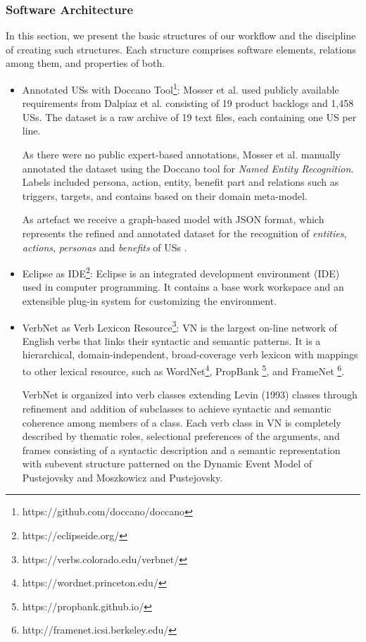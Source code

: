 \subsubsection*{Software Architecture}\label{conflict_architectur}
In this section, we present the basic structures of our workflow and the discipline of creating such structures. Each structure comprises software elements, relations among them, and properties of both.
\begin{itemize}
	\item Annotated USs with Doccano Tool\footnote{https://github.com/doccano/doccano}: Mosser et al. used publicly available requirements from Dalpiaz et al.\cite{Dalpiaz2018} consisting of 19 product backlogs and 1,458 USs. The dataset is a raw archive of 19 text files, each containing one US per line. 
	
	As there were no public expert-based annotations, Mosser et al. manually annotated the dataset using the Doccano tool for \textit{Named Entity Recognition}. Labels included persona, action, entity, benefit part and relations such as triggers, targets, and contains based on their domain meta-model.
	
	As artefact we receive a graph-based model with JSON format, which represents the refined and annotated dataset for the recognition of \emph{entities}, \emph{actions}, \emph{personas} and \emph{benefits} of USs \cite{mosser2022modelling}.
	
	\item Eclipse as IDE\footnote{https://eclipseide.org/}: Eclipse is an integrated development environment (IDE) used in computer programming. It contains a base work workspace and an extensible plug-in system for customizing the environment.
	
	\item VerbNet as Verb Lexicon Resource\footnote{https://verbs.colorado.edu/verbnet/}: VN is the largest on-line network of English verbs that links their syntactic and semantic patterns. It is a hierarchical, domain-independent, broad-coverage verb lexicon with mappings to other lexical resource, such as WordNet\footnote{https://wordnet.princeton.edu/}, PropBank \footnote{https://propbank.github.io/}, and FrameNet \footnote{http://framenet.icsi.berkeley.edu/}. 
	
	VerbNet is organized into verb classes extending Levin (1993) classes through refinement and addition of subclasses to achieve syntactic and semantic coherence among members of a class. Each verb class in VN is completely described by thematic roles, selectional preferences of the arguments, and frames consisting of a syntactic description and a semantic representation with subevent structure patterned on the Dynamic Event Model of Pustejovsky and Moszkowicz and Pustejovsky\cite{kipper2006extending}.
	

\end{itemize}
